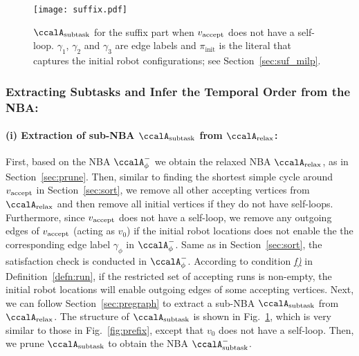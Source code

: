 \documentclass[Afour,sageh,times]{sagej}
\newcommand{\auto}[1]{\ccalA_{\textup{#1}}}
\newcommand{\autop}{\ccalA_{\phi}}
\newcommand{\vertex}[1]{v_{\textup{#1}}}
\begin{document}
{{{  \begin{figure}[!t]
    \centering
    \texttt{[image: suffix.pdf]}
    \caption{$\auto{subtask}$ for the suffix part when $\vertex{accept}$ does not have a self-loop. $\gamma_1$, $\gamma_2$ and $\gamma_3$ are edge labels and $\pi_{\text{init}}$ is the literal that captures the initial robot configurations; see Section~\ref{sec:suf_milp}.}
    \label{fig:suffix}
  \end{figure}

  \subsubsection{Extracting Subtasks and Infer the Temporal Order from the NBA:}\label{sec:suf_prune}
  \paragraph{(i) Extraction of sub-NBA $\auto{subtask}$ from $\auto{relax}$:} First, based on the NBA $\autop^-$ we obtain the relaxed NBA $\auto{relax}$, as in Section~\ref{sec:prune}.  Then, similar to finding the shortest simple cycle around $\vertex{accept}$ in Section~\ref{sec:sort}, we remove all other accepting vertices from $\auto{relax}$ and then remove all initial vertices if they do not have self-loops. Furthermore, since $\vertex{accept}$ does not have a self-loop, we remove any outgoing edges of $\vertex{accept}$ (acting as $v_0$) if the initial robot locations does not enable the the corresponding edge label $\gamma_\phi$ in $\autop^-$. Same as in Section~\ref{sec:sort}, the satisfaction check is conducted in $\autop^-$. According to condition \hyperref[cond:f]{\it f)} in Definition~\ref{defn:run}, if the restricted set of accepting runs is non-empty, the initial robot locations will enable outgoing edges of some accepting vertices. Next, we can follow Section~\ref{sec:pregraph} to  extract a sub-NBA $\auto{subtask}$ from $\auto{relax}$. The structure of $\auto{subtask}$ is shown in Fig.~\ref{fig:suffix}, which is very similar to those in Fig.~\ref{fig:prefix}, except that $v_0$ does not have a self-loop.  Then, we prune $\auto{subtask}$ to obtain the NBA $\auto{subtask}^-$.
}}}
\end{document}
